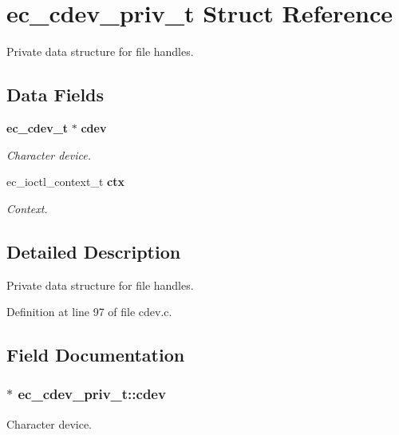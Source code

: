 \section{ec\-\_\-cdev\-\_\-priv\-\_\-t Struct Reference}
\label{structec__cdev__priv__t}


Private data structure for file handles.  


\subsection*{Data Fields}
\begin{DoxyCompactItemize}
\item 
{\bf ec\-\_\-cdev\-\_\-t} $\ast$ {\bf cdev}
\begin{DoxyCompactList}\small\item\em Character device. \end{DoxyCompactList}\item 
ec\-\_\-ioctl\-\_\-context\-\_\-t {\bf ctx}
\begin{DoxyCompactList}\small\item\em Context. \end{DoxyCompactList}\end{DoxyCompactItemize}


\subsection{Detailed Description}
Private data structure for file handles. 

Definition at line 97 of file cdev.\-c.



\subsection{Field Documentation}
\subsubsection[{cdev}]{$\ast$ ec\-\_\-cdev\-\_\-priv\-\_\-t\-::cdev}\label{structec__cdev__priv__t_a4b14b3ffbcd6f71b1b38c82a5b046992}


Character device. 



